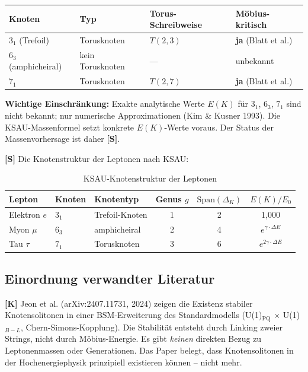 \begin{center}
\begin{tabular}{llll}
\toprule
Knoten & Typ & Torus-Schreibweise & Möbius-kritisch \\
\midrule
$3_1$ (Trefoil)  & Torusknoten & $T(2,3)$ & \textbf{ja} (Blatt et al.) \\
$6_3$ (amphicheiral) & kein Torusknoten & --- & unbekannt \\
$7_1$ & Torusknoten & $T(2,7)$ & \textbf{ja} (Blatt et al.) \\
\bottomrule
\end{tabular}
\end{center}

\textbf{Wichtige Einschränkung:} Exakte analytische Werte $E(K)$ für
$3_1$, $6_3$, $7_1$ sind nicht bekannt; nur numerische Approximationen
(Kim \& Kusner 1993). Die KSAU-Massenformel setzt konkrete $E(K)$-Werte
voraus. Der Status der Massenvorhersage ist daher \textbf{[S]}.

\textbf{[S]} Die Knotenstruktur der Leptonen nach KSAU:

\begin{table}[h]
\centering
\caption{KSAU-Knotenstruktur der Leptonen}
\label{tab:ksau_knoten}
\begin{tabular}{lllccc}
\toprule
Lepton & Knoten & Knotentyp & Genus $g$ &
  $\text{Span}(\Delta_K)$ & $E(K)/E_0$ \\
\midrule
Elektron $e$   & $3_1$ & Trefoil-Knoten   & 1 & 2 & 1{,}000 \\
Myon $\mu$     & $6_3$ & amphicheiral     & 2 & 4 & $e^{\gamma\cdot\Delta E}$ \\
Tau $\tau$     & $7_1$ & Torusknoten      & 3 & 6 & $e^{2\gamma\cdot\Delta E}$ \\
\bottomrule
\end{tabular}
\end{table}

\subsection{Einordnung verwandter Literatur}

\textbf{[K]} Jeon et al. (arXiv:2407.11731, 2024) zeigen die Existenz
stabiler Knotensolitonen in einer BSM-Erweiterung des Standardmodells
(U(1)$_\text{PQ}$ $\times$ U(1)$_{B-L}$, Chern-Simons-Kopplung). Die
Stabilität entsteht durch Linking zweier Strings, nicht durch
Möbius-Energie. Es gibt \emph{keinen} direkten Bezug zu
Leptonenmassen oder Generationen. Das Paper belegt, dass Knotensolitonen
in der Hochenergiephysik prinzipiell existieren können -- nicht mehr.

